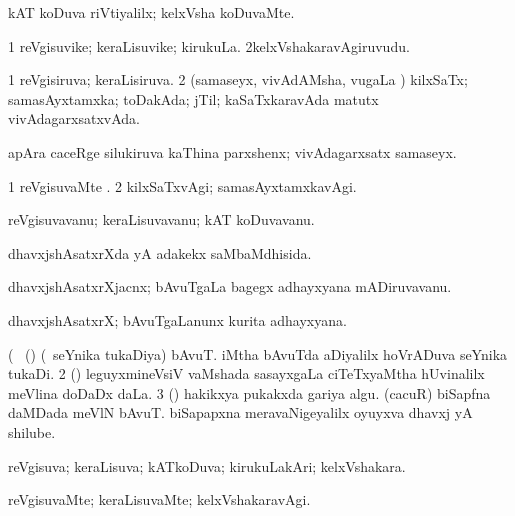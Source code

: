 {{{{\bentry
{} 
\gl{\kirxvi}
\expl{}
\bmng
 kAT koDuva riVtiyalilx; kelxVsha koDuvaMte. 
\emng
\eentry

\bentry
{} 
\gl{\nA}
\expl{}
\bmng
\bnum
\num{1} reVgisuvike; keraLisuvike; kirukuLa. 
\num{2}kelxVshakaravAgiruvudu. 
\enum
\emng
\eentry

\bentry
{} 
\gl{\gu}
\expl{}
\bmng
\bnum
\num{1} reVgisiruva; keraLisiruva. 
\num{2} (samaseyx, vivAdAMsha, \mo vugaLa \vi) kilxSaTx; samasAyxtamxka; toDakAda; jTil; kaSaTxkaravAda matutx vivAdagarxsatxvAda. 
\enum
\emng

\noindent 
\gl{\pagu}
\expl{}
\bmng
  apAra caceRge silukiruva kaThina parxshenx; vivAdagarxsatx samaseyx. 
\emng
\eentry

\bentry
{} 
\gl{\kirxvi}
\expl{}
\bmng
\bnum
\num{1} reVgisuvaMte . 
\num{2} kilxSaTxvAgi; samasAyxtamxkavAgi. 
\enum
\emng
\eentry

\bentry
{} 
\gl{\nA}
\expl{}
\bmng
 reVgisuvavanu; keraLisuvavanu; kAT koDuvavanu. 
\emng
\eentry

\bentry
{} 
\gl{\gu}
\expl{}
\bmng
 dhavxjshAsatxrXda yA adakekx saMbaMdhisida. 
\emng
\eentry

\bentry
{} 
\gl{\nA}
\expl{}
\bmng
 dhavxjshAsatxrXjacnx; bAvuTgaLa bagegx adhayxyana mADiruvavanu. 
\emng
\eentry

\bentry
{} 
\gl{\nA}
\expl{}
\bmng
 dhavxjshAsatxrX; bAvuTgaLanunx kurita adhayxyana. 
\emng
\eentry

\bentry
{} 
\gl{\nA}(\bava\ 
\bmng
\bnum
{} (\roVca) 
\banum
{} (\kanmu\ seYnika tukaDiya) bAvuT. 
 iMtha bAvuTda aDiyalilx hoVrADuva seYnika tukaDi. 
\eanum
\numie
\num{2} (\savi) leguyxmineVsiV vaMshada sasayxgaLa ciTeTxyaMtha hUvinalilx meVlina doDaDx daLa. 
\num{3} (\pArxvi) hakikxya pukakxda gariya algu. 
\banum
{} (cacuR) biSapfna daMDada meVlN bAvuT. 
 biSapapxna meravaNigeyalilx oyuyxva dhavxj yA shilube. 
\eanum
\numie
\enum
\emng
\eentry

\bentry
{} 
\gl{\gu}
\expl{}
\bmng
 reVgisuva; keraLisuva; kATkoDuva; kirukuLakAri; kelxVshakara. 
\emng
\eentry

\bentry
{} 
\gl{\kirxvi}
\expl{}
\bmng
 reVgisuvaMte; keraLisuvaMte; kelxVshakaravAgi. 
\emng
\eentry

}}}}
